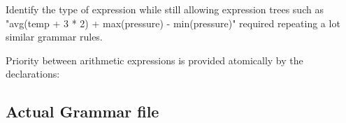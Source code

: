 Identify the type of expression while still allowing expression trees such as "avg(temp + 3 * 2) + max(pressure) - min(pressure)" required repeating a lot similar grammar rules.

Priority between arithmetic expressions is provided atomically by the declarations:
\begin{code}
\end{code}

\subsection{Actual Grammar file}
\begin{code}

\end{code}  
